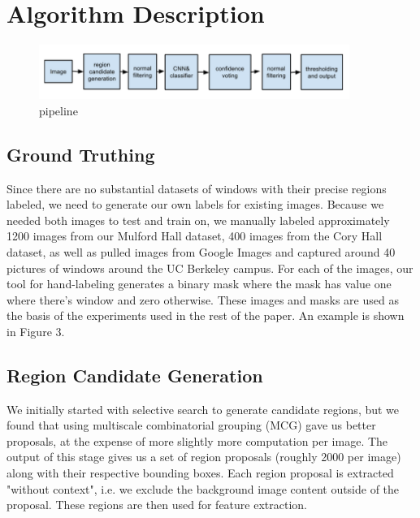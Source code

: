 \documentclass[10pt,twocolumn,letterpaper]{article}
\begin{document}
\section{Algorithm Description}

\begin{figure}[t!]
\centering
\includegraphics[width=0.9\textwidth]{plots/pipeline.png}
\caption{pipeline}
\end{figure}

\subsection{Ground Truthing}
Since there are no substantial datasets of windows with their precise regions labeled, we need to generate our own labels for existing images. Because we needed both images to test and train on, we manually labeled approximately 1200 images from our Mulford Hall dataset, 400 images from the Cory Hall dataset, as well as pulled images from Google Images and captured around 40 pictures of windows around the UC Berkeley campus. For each of the images, our tool for hand-labeling generates a binary mask where the mask has value one where there's window and zero otherwise. These images and masks are used as the basis of the experiments used in the rest of the paper. An example is shown in Figure 3.

\subsection{Region Candidate Generation}
We initially started with selective search to generate candidate regions, but we found that using multiscale combinatorial grouping (MCG) \cite{mcg} gave us better proposals, at the expense of more slightly more computation per image. The output of this stage gives us a set of region proposals (roughly 2000 per image) along with their respective bounding boxes. Each region proposal is extracted "without context", i.e. we exclude the background image content outside of the proposal. These regions are then used for feature extraction.
\end{document}
